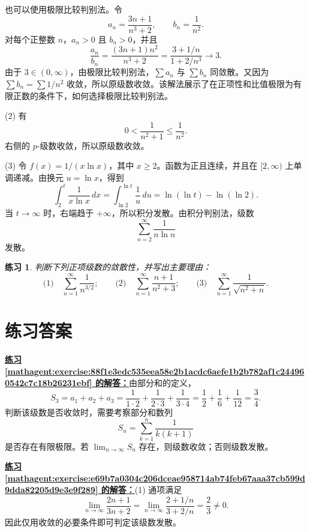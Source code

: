 \documentclass[UTF8,fontset=fandol,11pt]{ctexart}
\newtheorem{exercise}[definition]{练习}
\begin{document}
也可以使用极限比较判别法。令
\[
a_n=\frac{3n+1}{n^3+2},\qquad b_n=\frac1{n^2}.
\]
对每个正整数 $n$，$a_n>0$ 且 $b_n>0$，并且
\[
\frac{a_n}{b_n}=\frac{(3n+1)n^2}{n^3+2}
=\frac{3+1/n}{1+2/n^3}\longrightarrow3.
\]
由于 $3\in(0,\infty)$，由极限比较判别法，$\sum a_n$ 与 $\sum b_n$ 同敛散。又因为 $\sum b_n=\sum 1/n^2$ 收敛，所以原级数收敛。该解法展示了在正项性和比值极限为有限正数的条件下，如何选择极限比较判别法。

(2) 有
\[
0<\frac{1}{n^2+1}\leq\frac{1}{n^2}.
\]
右侧的 $p$-级数收敛，所以原级数收敛。

(3) 令 $f(x)=1/(x\ln x)$，其中 $x\geq2$。函数为正且连续，并且在 $[2,\infty)$ 上单调递减。由换元 $u=\ln x$，得到
\[
\int_2^t\frac{1}{x\ln x}\,dx
=\int_{\ln2}^{\ln t}\frac{1}{u}\,du
=\ln(\ln t)-\ln(\ln2).
\]
当 $t\to\infty$ 时，右端趋于 $+\infty$，所以积分发散。由积分判别法，级数
\[
\sum_{n=2}^{\infty}\frac{1}{n\ln n}
\]
发散。\par
\begin{exercise}
\label{mathagent:exercise:0f13776c11d825df9fdf2c3c249691355909a96d5e874285ceb15e0c4116d477}
判断下列正项级数的敛散性，并写出主要理由：
\[
\text{(1)}\quad\sum_{n=1}^{\infty}\frac{1}{n^{3/2}};
\qquad
\text{(2)}\quad\sum_{n=1}^{\infty}\frac{n+1}{n^2+3};
\qquad
\text{(3)}\quad\sum_{n=1}^{\infty}\frac{1}{\sqrt{n^2+n}}.
\]

\end{exercise}
\section*{练习答案}
\par\noindent\textbf{\hyperref[mathagent:exercise:88f1e3edc535eea58e2b1acdc6aefe1b2b782af1c244960542c7c18b26231ebf]{练习 \ref*{mathagent:exercise:88f1e3edc535eea58e2b1acdc6aefe1b2b782af1c244960542c7c18b26231ebf} 的解答：}}由部分和的定义，
\[
S_3=a_1+a_2+a_3
=\frac{1}{1\cdot2}+\frac{1}{2\cdot3}+\frac{1}{3\cdot4}
=\frac12+\frac16+\frac1{12}
=\frac34.
\]
判断该级数是否收敛时，需要考察部分和数列
\[
S_n=\sum_{k=1}^{n}\frac{1}{k(k+1)}
\]
是否存在有限极限。若 $\lim_{n\to\infty}S_n$ 存在，则级数收敛；否则级数发散。\par
\par\noindent\textbf{\hyperref[mathagent:exercise:e69b7a0304c206dceae958714ab74feb67aaa37cb599d9dda82205d9e3e9f289]{练习 \ref*{mathagent:exercise:e69b7a0304c206dceae958714ab74feb67aaa37cb599d9dda82205d9e3e9f289} 的解答：}}(1) 通项满足
\[
\lim_{n\to\infty}\frac{2n+1}{3n+2}
=\lim_{n\to\infty}\frac{2+1/n}{3+2/n}=\frac23\ne0.
\]
因此仅用收敛的必要条件即可判定该级数发散。
\end{document}
